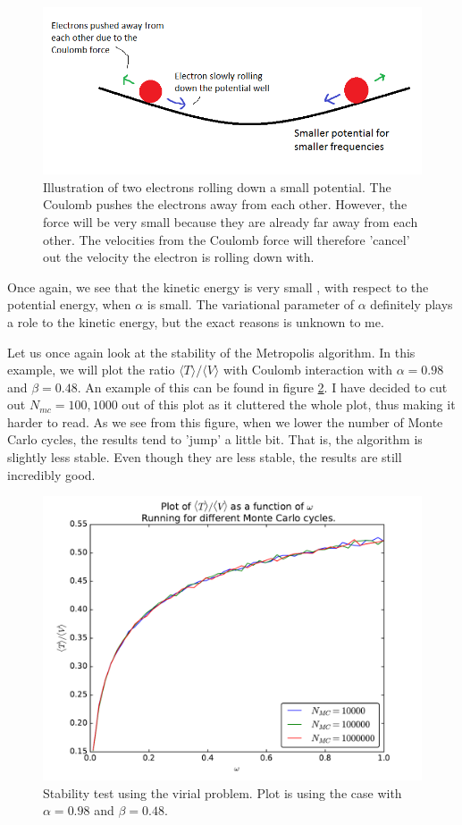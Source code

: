 \documentclass[12pt]{article}
\begin{document}
\begin{figure}[h]
\centering
\includegraphics[width=\linewidth]{Virial-example.png}
\caption{Illustration of two electrons rolling down a small potential. The Coulomb pushes the electrons away from each other. However, the force will be very small because they are already far away from each other. The velocities from the Coulomb force will therefore 'cancel' out the velocity the electron is rolling down with.}
\label{fig:Virial_Example}
\end{figure}

Once again, we see that the kinetic energy is very small , with respect to the potential energy, when $\alpha$ is small. The variational parameter of $\alpha$ definitely plays a role to the kinetic energy, but the exact reasons is unknown to me.

Let us once again look at the stability of the Metropolis algorithm. In this example, we will plot the ratio $\langle T \rangle / \langle V \rangle$ with Coulomb interaction with $\alpha = 0.98$ and $\beta = 0.48$. An example of this can be found in figure \ref{fig:Stability_virial}. I have decided to cut out $N_{mc} = 100, 1000$ out of this plot as it cluttered the whole plot, thus making it harder to read. As we see from this figure, when we lower the number of Monte Carlo cycles, the results tend to 'jump' a little bit. That is, the algorithm is slightly less stable. Even though they are less stable, the results are still incredibly good.
\begin{figure}[h]
\centering
\includegraphics[width=\linewidth]{Plots/Virial_stability_test.pdf}
\caption{Stability test using the virial problem. Plot is using the case with $\alpha = 0.98$ and $\beta = 0.48$.}
\label{fig:Stability_virial}
\end{figure}
\FloatBarrier
\end{document}
